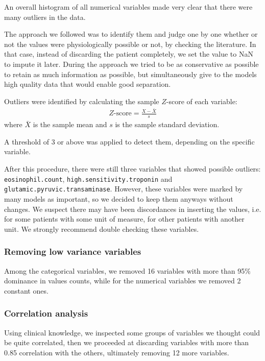 An overall histogram of all numerical variables made very clear that there were many outliers in the data.

The approach we followed was to identify them and judge one by one whether or not the values were physiologically possible or not, by checking the literature. In that case, instead of discarding the patient completely, we set the value to NaN to impute it later. During the approach we tried to be as conservative as possible to retain as much information as possible, but simultaneously give to the models high quality data that would enable good separation.

Outliers were identified by calculating the sample $Z$-score of each variable:
\begin{align*}
    Z\text{-score} = \frac{X-\bar{X}}{s}
\end{align*}
where $\bar{X}$ is the sample mean and $s$ is the sample standard deviation.

A threshold of 3 or above was applied to detect them, depending on the specific variable.

After this procedure, there were still three variables that showed possible outliers: \texttt{eosinophil.count}, \texttt{high.sensitivity.troponin} and \texttt{glutamic.pyruvic.transaminase}. However, these variables were marked by many models as important, so we decided to keep them anyways without changes. We suspect there may have been discordances in inserting the values, i.e. for some patients with some unit of measure, for other patients with another unit. We strongly recommend double checking these variables.

\subsubsection{Removing low variance variables}

Among the categorical variables, we removed 16 variables with more than 95\% dominance in values counts, while for the numerical variables we removed 2 constant ones.

\subsubsection{Correlation analysis}

Using clinical knowledge, we inspected some groups of variables we thought could be quite correlated, then we proceeded at discarding variables with more than 0.85 correlation with the others, ultimately removing 12 more variables.

